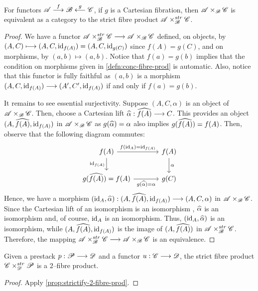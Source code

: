 \documentclass[11pt]{amsart}
\begin{document}
\begin{prop}\label{prop:strictify-2-fibre-prod}
For functors $\sA \to[f] \sB \ot[g] \sC$, if $g$ is a Cartesian fibration,
then $\mathscr{A} \times_\mathscr{B} \mathscr{C}$ is equivalent as a category to the strict fibre product
$\mathscr{A} \times^{str}_\mathscr{B} \mathscr{C}$.
\end{prop}
\begin{proof}
We have a functor $\sA \times^{str}_\sB \sC \to \sA \times_\sB \sC$ defined, on objects, by
$(A, C) \mapsto (A, C, \id_{f(A)}) = (A, C, \id_{g(C)})$ since $f(A) = g(C)$, and on morphisms,
by $(a, b) \mapsto (a, b)$. Notice that $f(a) = g(b)$ implies that the condition on morphisms
given in \cref{defn:conc-fibre-prod} is automatic. Also, notice that this functor is fully faithful
as $(a, b)$ is a morphism $(A, C, \id_{f(A)}) \to (A', C', \id_{f(A)})$ if and only if
$f(a) = g(b)$.

It remains to see essential surjectivity. Suppose $(A, C, \alpha)$ is an
object of $\mathscr{A} \times_\mathscr{B} \mathscr{C}$. Then, choose a Cartesian lift $\wh{\alpha} : \wh{f(A)} \to C$.
This provides an object $(A, \widehat{f(A)}, \mathrm{id}_{f(A)})$ in $\mathscr{A} \times_\mathscr{B} \mathscr{C}$ as
$g(\widehat{\alpha}) = \alpha$ also implies $g(\widehat{f(A)}) = f(A)$.
Then, observe that the following diagram commutes:
\[\begin{tikzcd}[column sep=large]
f(A) \ar[r, "f(\id_A) = \id_{f(A)}"] \ar[d, "\id_{f(A)}" left] & f(A) \ar[d, "\alpha"] \\
g(\wh{f(A)}) = f(A) \ar[r, "g(\wh{\alpha}) = \alpha" below] & g(C)
\end{tikzcd}\]
Hence, we have a morphism  $(\id_A, \wh{\alpha}) : (A, \wh{f(A)}, \id_{f(A)}) \to (A, C, \alpha)$ in
$\mathscr{A} \times_\mathscr{B} \mathscr{C}$.
Since the Cartesian lift of an isomorphism is an isomorphism
\cite[\href{https://stacks.math.columbia.edu/tag/02XL}{Lemma 02XL}]{stacks-project},
$\widehat{\alpha}$ is an isomorphism
and, of course, $\mathrm{id}_{A}$ is an isomorphism. Thus, $(\mathrm{id}_A, \widehat{\alpha})$ is an isomorphism,
while $(A, \widehat{f(A)}, \mathrm{id}_{f(A)})$ is the image of $(A, \widehat{f(A)})$ in $\mathscr{A} \times_\mathscr{B}^{str} \mathscr{C}$.
Therefore, the mapping $\sA \times^{str}_\sB \sC \to \sA \times_\sB \sC$ is an equivalence.
\end{proof}

\begin{cor}\label{cor:prest-pullback-strict}
Given a prestack $p : \sP \to \sD$ and a functor $u : \sC \to \sD$, the strict fibre product
$\mathscr{C} \times_\mathscr{D}^{str} \mathscr{P}$ is a $2$--fibre product.
\end{cor}
\begin{proof}
Apply \cref{prop:strictify-2-fibre-prod}.
\end{proof}
\end{document}
